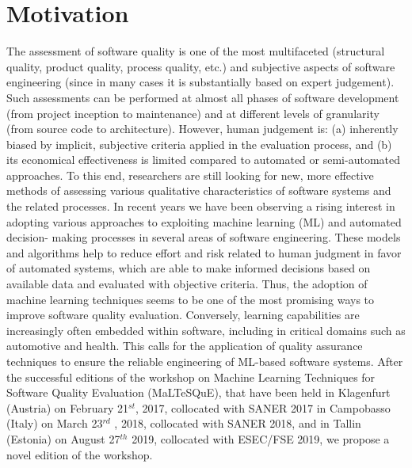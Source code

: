 \section{Motivation}
\label{sec:motivation}
The assessment of software quality is one of the most multifaceted (\eg structural quality, product quality, process quality, etc.) and subjective aspects of software engineering (since in many cases it is substantially based on expert judgement). Such assessments can be performed at almost all phases of software development (from project inception to maintenance) and at different levels of granularity (from source code to architecture). However, human judgement is: (a) inherently biased by implicit, subjective criteria applied in the evaluation process, and (b) its economical effectiveness is limited compared to automated or semi-automated approaches. To this end, researchers are still looking for new, more effective methods of assessing various qualitative characteristics of software systems and the related processes.
In recent years we have been observing a rising interest in adopting various approaches to exploiting machine learning (ML) and automated decision- making processes in several areas of software engineering. These models and algorithms help to reduce effort and risk related to human judgment in favor of automated systems, which are able to make informed decisions based on available data and evaluated with objective criteria. Thus, the adoption of machine learning techniques seems to be one of the most promising ways to improve software quality evaluation.
Conversely, learning capabilities are increasingly often embedded within software, including in critical domains such as automotive and health. This calls for the application of quality assurance techniques to ensure the reliable engineering of ML-based software systems.
After the successful editions of the workshop on Machine Learning Techniques for Software Quality Evaluation (MaLTeSQuE), that have been held in Klagenfurt (Austria) on February 21$^{st}$, 2017, collocated with SANER 2017 in Campobasso (Italy) on March 23$^{rd}$ , 2018, collocated with SANER 2018, and in Tallin (Estonia) on August 27$^{th}$ 2019, collocated with ESEC/FSE 2019, we propose a novel edition of the workshop.







